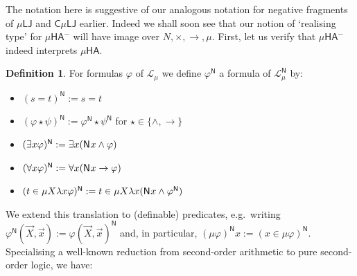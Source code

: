 \documentclass[10pt,a4paper]{amsart}
\theoremstyle{plain}
\theoremstyle{definition}
\newtheorem{definition}[definition]{Definition}
\renewcommand{\phi}{\varphi}
\newcommand{\dfn}{:=}
\newcommand{\red}[1]{{\color{red}#1}}
\newcommand{\todonew}[1]{{\red{TodoNew: #1}}}
\renewcommand{\todonew}[1]{}
\theoremstyle{plain}
\theoremstyle{definition} %
\newcommand{\nat}{\mathit{N}}
\newcommand{\LJ}{\mathsf{LJ}}
\newcommand{\muLJ}{\mu\LJ}
\newcommand{\circular}{\mathsf C}
\newcommand{\cmuLJ}{\circular\muLJ}
\renewcommand{\lor}{\vee}
\renewcommand{\land}{\wedge}
\newcommand{\limp}{\to}
\newcommand{\Lang}{\mathcal L}
\newcommand{\lang}[1]{\Lang_{#1}}
\newcommand{\langmuarith}{\lang \mu}
\newcommand{\HA}{\mathsf{HA}}
\newcommand{\muHA}{\mu\HA}
\newcommand{\preaxiom}{\mathsf{Pre}}
\newcommand{\indaxiom}{\mathsf{Ind}}
\newcommand{\pNat}{\mathsf{N}}
\newcommand{\pnat}[1]{\pNat\hspace{.05em} #1 }
\newcommand{\nattrans}[1]{#1^{\pNat}}
\newcommand{\muIFOL}{\mu\mathit{IFOL}}
\newcommand{\muHAneg}{\muHA^-}
\begin{document}
The notation here is suggestive of our analogous notation for negative fragments of $\muLJ$ and $\cmuLJ$ earlier.
Indeed we shall soon see that our notion of `realising type' for $\muHAneg$ will have image over $\nat, \times, \limp,\mu$.
First, let us verify that $\muHAneg$ indeed interprets $\muHA$.


\begin{definition}
    For formulas $\phi$ of $\langmuarith$ we define $\nattrans \phi$ a formula of $\langmuarith^\pNat$ by:
    \begin{itemize}
        \item $ \nattrans{(s=t)} \dfn s=t $
        \item $\nattrans {(\phi \star \psi)} \dfn \nattrans \phi \star \nattrans \psi $ for $\star \in\{ \land, \limp\}$
        \item $\nattrans {(\exists x \phi)} \dfn \exists x (\pnat x \land \phi)$
        \item $\nattrans{(\forall x \phi)}\dfn \forall x (\pnat x \limp \phi)$
          \item $ \nattrans{(t \in\mu X \lambda x \phi)} \dfn t \in \mu X \lambda x (\pnat x \land \nattrans\phi)$
    \end{itemize}
\end{definition}


We extend this translation to (definable) predicates, e.g.\ writing $\nattrans \phi(\vec X,\vec x)\dfn \nattrans{\phi(\vec X,\vec x)}$ and, in particular, $\nattrans{(\mu\phi)}x\dfn \nattrans{(x \in \mu\phi)}$.
% 
% 
% 
Specialising a well-known reduction from second-order arithmetic to pure second-order logic, we have:
\end{document}
